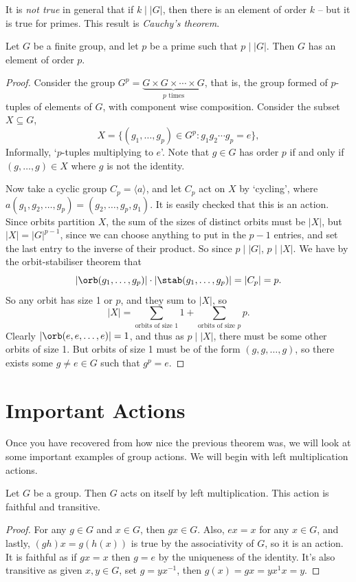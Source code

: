 \documentclass[a4]{scrreprt}
\begin{document}
It is \emph{not true} in general that if $k \mid |G|$, then there is an element of order $k$ -- but it is true for primes. This result is \emph{Cauchy's theorem}.

\begin{theorem}
	Let $G$ be a finite group, and let $p$ be a prime such that $p \mid |G|$. Then $G$ has an element of order $p$.
\end{theorem}
\begin{proof}
	Consider the group $G^p = \underbrace{G\times G \times \cdots \times G}_{p\text{ times}}$, that is, the group formed of $p$-tuples of elements of $G$, with component wise composition. Consider the subset $X \subseteq G$,
	$$
	X = \{(g_1, \dots, g_p) \in G^p : g_1 g_2 \cdots g_p = e\},
	$$
	Informally, `$p$-tuples multiplying to $e$'. Note that $g \in G$ has order $p$ if and only if $(g, \dots, g) \in X$ where $g$ is not the identity.

	Now take a cyclic group $C_p = \langle a \rangle$, and let $C_p$ act on $X$ by `cycling', where $a(g_1, g_2, \dots, g_p) = (g_2, \dots, g_p, g_1)$. It is easily checked that this is an action.
	Since orbits partition $X$, the sum of the sizes of distinct orbits must be $|X|$, but $|X| = |G|^{p - 1}$, since we can choose anything to put in the $p - 1$ entries, and set the last entry to the inverse of their product. So since $p \mid |G|$, $p \mid |X|$. We have by the orbit-stabiliser theorem that
	$$
	|\orb(g_1, \dots, g_p)| \cdot |\stab(g_1, \dots, g_p)| = |C_p| = p.
	$$
	So any orbit has size 1 or $p$, and they sum to $|X|$, so
	$$
	|X| = \sum_{\text{orbits of size 1}} 1 + \sum_{\text{orbits of size $p$}} p.
	$$
	Clearly $|\orb(e, e, \dots, e)| = 1$, and thus as $p \mid |X|$, there must be some other orbits of size 1.
	But orbits of size 1 must be of the form $(g, g, \dots, g)$, so there exists some $g \neq e \in G$ such that $g^p = e$.
\end{proof}

\section{Important Actions}

Once you have recovered from how nice the previous theorem was, we will look at some important examples of group actions. We will begin with left multiplication actions.

\begin{lemma}
	Let $G$ be a group. Then $G$ acts on itself by left multiplication. This action is faithful and transitive.
\end{lemma}
\begin{proof}
	For any $g \in G$ and $x \in G$, then $gx \in G$. Also, $ex = x$ for any $x \in G$, and lastly, $(gh)x = g(h(x))$ is true by the associativity of $G$, so it is an action. It is faithful as if $gx = x$ then $g = e$ by the uniqueness of the identity. It's also transitive as given $x, y \in G$, set $g = yx^{-1}$, then $g(x) = gx = yx^{1}x = y$. 
\end{proof}
\end{document}
